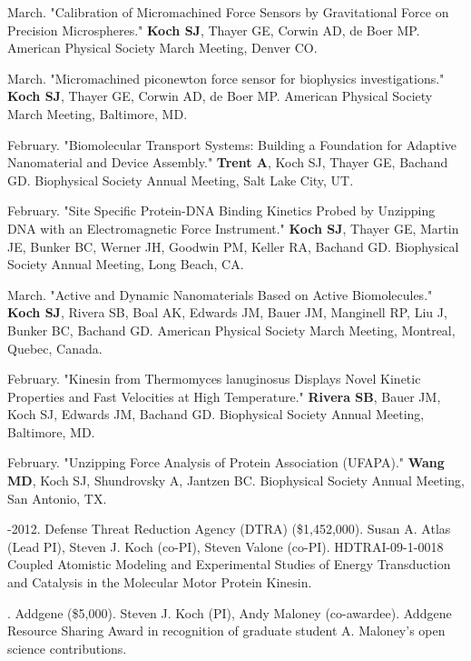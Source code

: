 \documentclass[11pt]{article}
\begin{document}
 March. "Calibration of Micromachined Force Sensors by Gravitational Force on Precision Microspheres." \textbf{Koch SJ}, Thayer GE, Corwin AD, de Boer MP. American Physical Society March Meeting, Denver CO.

 March. "Micromachined piconewton force sensor for biophysics investigations." \textbf{Koch SJ}, Thayer GE, Corwin AD, de Boer MP. American Physical Society March Meeting, Baltimore, MD.

 February. "Biomolecular Transport Systems: Building a Foundation for Adaptive Nanomaterial and Device Assembly." \textbf{Trent A}, Koch SJ, Thayer GE, Bachand GD. Biophysical Society Annual Meeting, Salt Lake City, UT.

 February. "Site Specific Protein-DNA Binding Kinetics Probed by Unzipping DNA with an Electromagnetic Force Instrument." \textbf{Koch SJ}, Thayer GE, Martin JE, Bunker BC, Werner JH, Goodwin PM, Keller RA, Bachand GD. Biophysical Society Annual Meeting, Long Beach, CA.

 March. "Active and Dynamic Nanomaterials Based on Active Biomolecules." \textbf{Koch SJ}, Rivera SB, Boal AK, Edwards JM, Bauer JM, Manginell RP, Liu J, Bunker BC, Bachand GD. American Physical Society March Meeting, Montreal, Quebec, Canada.

 February. "Kinesin from Thermomyces lanuginosus Displays Novel Kinetic Properties and Fast Velocities at High Temperature." \textbf{Rivera SB}, Bauer JM, Koch SJ, Edwards JM, Bachand GD. Biophysical Society Annual Meeting, Baltimore, MD.

 February. "Unzipping Force Analysis of Protein Association (UFAPA)." \newline \textbf{Wang MD}, Koch SJ, Shundrovsky A, Jantzen BC. Biophysical Society Annual Meeting, San Antonio, TX.

\bigskip

\medskip
  
-2012. Defense Threat Reduction Agency (\textsc{DTRA}) (\$1,452,000). Susan A. Atlas (Lead PI), Steven J. Koch (co-PI), Steven Valone (co-PI). HDTRAI-09-1-0018 Coupled Atomistic Modeling and Experimental Studies of Energy Transduction and Catalysis in the Molecular Motor Protein Kinesin.

. Addgene (\$5,000). Steven J. Koch (PI), Andy Maloney (co-awardee). Addgene Resource Sharing Award in recognition of graduate student A. Maloney's open science contributions.
\end{document}
